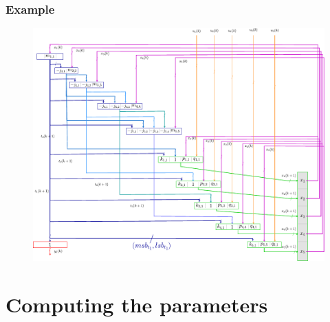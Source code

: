\begin{frame}
	\frametitle{Example}
	\begin{figure}
		\includegraphics[scale=0.8, trim=5cm 0cm 0cm 5cm,clip]{pictures/exampleScheme.pdf}
	\end{figure}
\end{frame}

\section{Computing the parameters}

